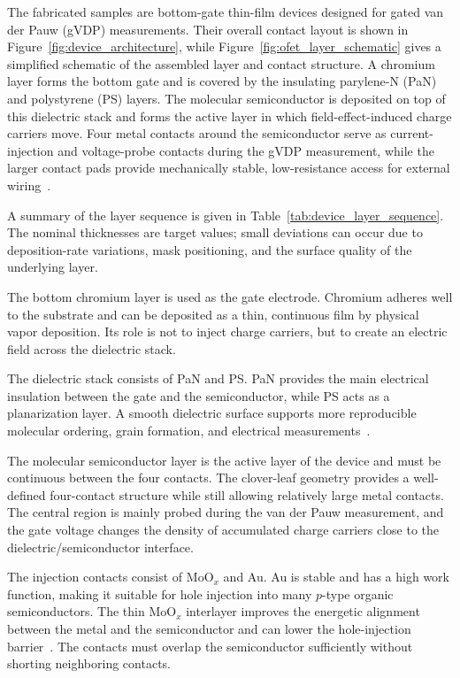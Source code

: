 The fabricated samples are bottom-gate thin-film devices designed for gated van der Pauw (gVDP) measurements. Their overall contact layout is shown in Figure~\ref{fig:device_architecture}, while Figure~\ref{fig:ofet_layer_schematic} gives a simplified schematic of the assembled layer and contact structure. A chromium layer forms the bottom gate and is covered by the insulating parylene-N (PaN) and polystyrene (PS) layers. The molecular semiconductor is deposited on top of this dielectric stack and forms the active layer in which field-effect-induced charge carriers move. Four metal contacts around the semiconductor serve as current-injection and voltage-probe contacts during the gVDP measurement, while the larger contact pads provide mechanically stable, low-resistance access for external wiring~\cite{Rolin2017GVDP,Lee2024GVDPIGZO}.

A summary of the layer sequence is given in Table~\ref{tab:device_layer_sequence}. The nominal thicknesses are target values; small deviations can occur due to deposition-rate variations, mask positioning, and the surface quality of the underlying layer.


The bottom chromium layer is used as the gate electrode. Chromium adheres well to the substrate and can be deposited as a thin, continuous film by physical vapor deposition. Its role is not to inject charge carriers, but to create an electric field across the dielectric stack.

The dielectric stack consists of PaN and PS. PaN provides the main electrical insulation between the gate and the semiconductor, while PS acts as a planarization layer. A smooth dielectric surface supports more reproducible molecular ordering, grain formation, and electrical measurements~\cite{Sirringhaus2005DevicePhysics,Wang2017LowVoltageC8BTBT}.

The molecular semiconductor layer is the active layer of the device and must be continuous between the four contacts. The clover-leaf geometry provides a well-defined four-contact structure while still allowing relatively large metal contacts. The central region is mainly probed during the van der Pauw measurement, and the gate voltage changes the density of accumulated charge carriers close to the dielectric/semiconductor interface.

The injection contacts consist of MoO$_x$ and Au. Au is stable and has a high work function, making it suitable for hole injection into many $p$-type organic semiconductors. The thin MoO$_x$ interlayer improves the energetic alignment between the metal and the semiconductor and can lower the hole-injection barrier~\cite{Greiner2013ThinFilmMetalOxides,Ablat2019OxideMetalBilayerElectrodes,Natali2012ChargeInjection}. The contacts must overlap the semiconductor sufficiently without shorting neighboring contacts.

